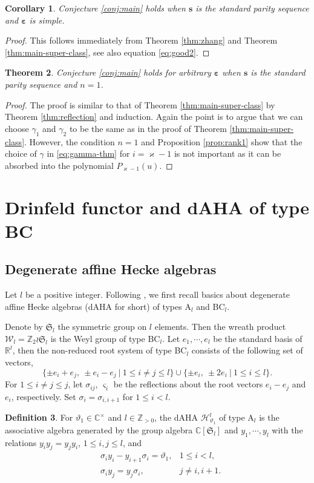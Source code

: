 \documentclass[11pt,reqno]{amsart}
\numberwithin{equation}{section}
\newtheorem{thm}{Theorem}[section]
\newtheorem{cor}[thm]{Corollary}
\theoremstyle{definition}
\newtheorem{dfn}[thm]{Definition}
\theoremstyle{remark}
\newcommand{\Z}{\mathbb{Z}}
\newcommand{\fkS}{\mathfrak{S}}
\newcommand{\bC}{\mathbb{C}}
\newcommand{\bR}{\mathbb{R}}
\newcommand{\lle}{\leqslant}
\newcommand{\ka}{\varkappa}
\newcommand{\ve}{\varepsilon}
\newcommand{\s}{{\bm s}}
\begin{document}
\begin{cor}
Conjecture \ref{conj:main} holds when $\s$ is the standard parity sequence and $\bm\ve$ is simple.
\end{cor}
\begin{proof}
This follows immediately from Theorem \ref{thm:zhang} and Theorem \ref{thm:main-super-class}, see also equation \eqref{eq:good2}.
\end{proof}

\begin{thm}
Conjecture \ref{conj:main} holds for arbitrary $\bm\ve$ when $\s$ is the standard parity sequence and $n=1$.
\end{thm}
\begin{proof}
The proof is similar to that of Theorem \ref{thm:main-super-class} by Theorem \ref{thm:reflection} and induction. Again the point is to argue that we can choose $\gamma_1$ and $\gamma_2$ to be the same as in the proof of Theorem \ref{thm:main-super-class}. However, the condition $n=1$ and Proposition \ref{prop:rank1} show that the choice of $\gamma$ in \eqref{eq:gamma-thm} for $i=\ka-1$ is not important as it can be absorbed into the polynomial $P_{\ka-1}(u)$. 
\end{proof}


\section{Drinfeld functor and dAHA of type BC}\label{sec:schur-weyl}
\subsection{Degenerate affine Hecke algebras} Let $l$ be a positive integer. Following \cite{Chen2014twisted}, we first recall basics about degenerate affine Hecke algebras (dAHA for short) of types A$_l$ and BC$_l$.

Denote by $\fkS_l$ the symmetric group on $l$ elements. Then the wreath product $\mathscr W_l=\Z_2\wr \fkS_l$ is the Weyl group of type BC$_l$. Let $e_1,\cdots,e_l$ be the standard basis of $\bR^l$, then the non-reduced root system of type BC$_l$ consists of the following set of vectors,
\[
\{\pm e_i+e_j, ~ \pm e_i-e_j~|~ 1\lle i\ne j \lle l\} \cup \{\pm e_i,~ \pm 2e_i ~|~ 1\lle i\lle l\}.
\]
For $1\lle i\ne j\lle j$, let $\sigma_{ij}$, $\varsigma_i$ be the reflections about the root vectors $e_i-e_j$ and $e_i$, respectively. Set $\sigma_i=\sigma_{i,i+1}$ for $1\lle i<l$.
\begin{dfn}
For $\vartheta_1\in\bC^\times$ and $l\in\Z_{>0}$, the dAHA $\mathscr{H}_{\vartheta_1}^l$ of type $\mathrm A_l$ is the associative algebra generated by the group algebra $\bC[\fkS_l]$ and $y_1,\cdots,y_l$ with the relations $y_iy_j=y_jy_i$, $1\lle i,j\lle l$, and
\begin{align*}
&\sigma_iy_i-y_{i+1}\sigma_i=\vartheta_1,&1\lle i< l,\\
&\sigma_iy_j=y_j\sigma_i, &j\ne i,i+1.
\end{align*}
\end{dfn}
\end{document}
